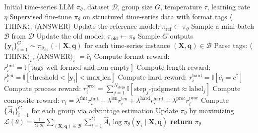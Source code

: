 \documentclass{article}
\theoremstyle{plain}
\theoremstyle{definition}
\theoremstyle{remark}
\begin{document}
\begin{algorithm}[htbp]
\caption{GRPO Training Pipeline of VeriTime}
\small
\label{alg:ts-grpo}
\begin{algorithmic}[1]
\REQUIRE Initial time-series LLM $\pi_\theta$, dataset $\mathcal{D}$, group size $G$, temperature $\tau$, learning rate $\eta$
\STATE Supervised fine-tune $\pi_\theta$ on structured time-series data with format tags $\langle$THINK$\rangle$, $\langle$ANSWER$\rangle$
    \STATE Update the reference model: $\pi_{\text{ref}} \leftarrow \pi_\theta$
        \STATE Sample a mini-batch $\mathcal{B}$ from $\mathcal{D}$
        \STATE Update the old model: $\pi_{\text{old}} \leftarrow \pi_\theta$
        \STATE Sample $G$ outputs $\{\mathbf{y}_i\}_{i=1}^{G} \sim \pi_{\theta_{\text{old}}}(\cdot \mid \mathbf{X}, \mathbf{q})$ for each time-series instance $(\mathbf{X}, \mathbf{q}) \in \mathcal{B}$
            \STATE Parse tags: $\langle$THINK$\rangle_i$, $\langle$ANSWER$\rangle_i$ $= \hat{c}_i$
            \STATE Compute format reward: $r_i^{\text{fmt}} = \mathbb{I}[\text{tags well-formed and non-empty}]$
            \STATE Compute length reward: $r_i^{\text{len}} = \mathbb{I}[\text{threshold} < |\mathbf{y}_i| < \text{max\_len}]$
            \STATE Compute hard reward: $r_i^{\text{hard}} = \mathbb{I}[\hat{c}_i = c^*]$
            \STATE Compute process reward: $r_i^{\text{proc}} = \sum_{j=1}^{N_{\text{steps}}} \mathbb{I}[\text{step}_j\text{-judgment} \approx \text{label}_j]$
            \STATE Compute composite reward: $r_i = \lambda^{\text{fmt}} r_i^{\text{fmt}} + \lambda^{\text{len}} r_i^{\text{len}} + \lambda^{\text{hard}} r_i^{\text{hard}} + \lambda^{\text{proc}} r_i^{\text{proc}}$
        \ENDFOR
        \STATE Compute $\{\hat{A}_i\}_{i=1}^{G}$ for each group via advantage estimation
        \STATE Update $\pi_\theta$ by maximizing $\mathcal{L}(\theta) = \frac{1}{G|\mathcal{B}|} \sum_{(\mathbf{X}, \mathbf{q}) \in \mathcal{B}} \sum_{i=1}^{G} \hat{A}_i \log \pi_\theta(\mathbf{y}_i \mid \mathbf{X}, \mathbf{q})$
    \ENDFOR
\ENDFOR
\STATE \textbf{return} $\pi_\theta$
\end{algorithmic}
\end{algorithm}
\end{document}
